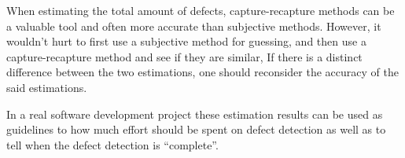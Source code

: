 When estimating the total amount of defects, capture-recapture methods can be a valuable tool and often more accurate than subjective methods. However, it wouldn't hurt to first use a subjective method for guessing, and then use a capture-recapture method and see if they are similar, If there is a distinct difference between the two estimations, one should reconsider the accuracy of the said estimations.

In a real software development project these estimation results can be used as guidelines to how much effort should be spent on defect detection as well as to tell when the defect detection is ``complete''. 
